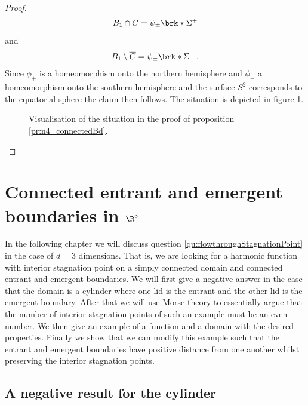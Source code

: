 \begin{proof}
  \begin{align*}
    B_1\cap C=\psi_\pm\brk*{\Sigma^+}
  \end{align*}
  and 
  \begin{align*}
	  B_1\setminus \overline{C}=\psi_\pm\brk*{\Sigma^-}\,.
  \end{align*}
  Since $\phi_+$ is a homeomorphism onto the northern hemisphere and
  $\phi_-$ a homeomorphism onto the southern hemisphere and the surface $S^2$
  corresponds to the equatorial sphere the claim then follows.
  The situation is depicted in figure \ref{fi:n4_sigma}.
  \begin{figure}[h]
    \centering
    \def\svgwidth{0.8\textwidth}
    
    \caption{Visualisation of the situation in the proof of proposition \ref{pr:n4_connectedBd}.}
    \label{fi:n4_sigma}
  \end{figure}
\end{proof}



\chapter{Connected entrant and emergent boundaries in $\R^3$}
\label{ch:n3_inflowOutflow}

In the following chapter we will discuss question \ref{qu:flowthroughStagnationPoint} in the case of $d=3$ dimensions.
That is, we are looking for a harmonic function with interior stagnation point on a simply connected domain and connected entrant and emergent
boundaries.
We will first give a negative answer in the case that the domain is a cylinder where one lid is the entrant and the other lid is the emergent boundary.
After that we will use Morse theory to essentially argue that the number of interior stagnation points
of such an example must be an even number.
We then give an example of a function and a domain with the desired properties.
Finally we show that we can modify this example such that the entrant and emergent boundaries have positive distance from one another whilst
preserving the interior stagnation points.

\section{A negative result for the cylinder}

